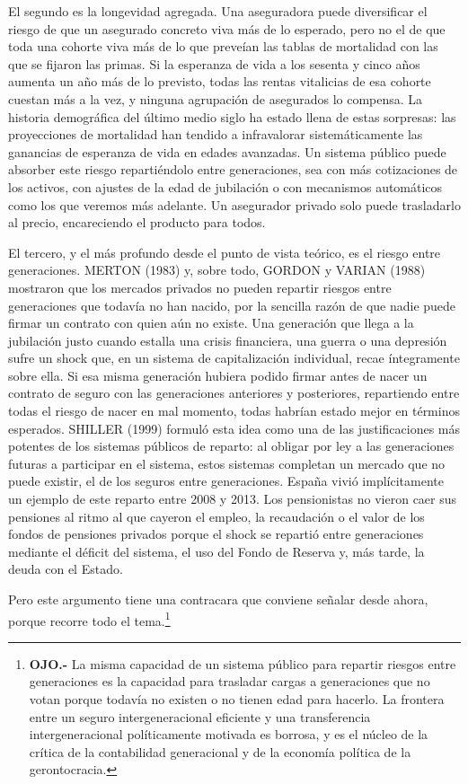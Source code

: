 \documentclass[10pt,a4paper]{article}
\begin{document}
El segundo es la longevidad agregada. Una aseguradora puede diversificar el riesgo de que un asegurado concreto viva más de lo esperado, pero no el de que toda una cohorte viva más de lo que preveían las tablas de mortalidad con las que se fijaron las primas. Si la esperanza de vida a los sesenta y cinco años aumenta un año más de lo previsto, todas las rentas vitalicias de esa cohorte cuestan más a la vez, y ninguna agrupación de asegurados lo compensa. La historia demográfica del último medio siglo ha estado llena de estas sorpresas: las proyecciones de mortalidad han tendido a infravalorar sistemáticamente las ganancias de esperanza de vida en edades avanzadas. Un sistema público puede absorber este riesgo repartiéndolo entre generaciones, sea con más cotizaciones de los activos, con ajustes de la edad de jubilación o con mecanismos automáticos como los que veremos más adelante. Un asegurador privado solo puede trasladarlo al precio, encareciendo el producto para todos.

El tercero, y el más profundo desde el punto de vista teórico, es el riesgo entre generaciones. MERTON (1983) y, sobre todo, GORDON y VARIAN (1988) mostraron que los mercados privados no pueden repartir riesgos entre generaciones que todavía no han nacido, por la sencilla razón de que nadie puede firmar un contrato con quien aún no existe. Una generación que llega a la jubilación justo cuando estalla una crisis financiera, una guerra o una depresión sufre un shock que, en un sistema de capitalización individual, recae íntegramente sobre ella. Si esa misma generación hubiera podido firmar antes de nacer un contrato de seguro con las generaciones anteriores y posteriores, repartiendo entre todas el riesgo de nacer en mal momento, todas habrían estado mejor en términos esperados. SHILLER (1999) formuló esta idea como una de las justificaciones más potentes de los sistemas públicos de reparto: al obligar por ley a las generaciones futuras a participar en el sistema, estos sistemas completan un mercado que no puede existir, el de los seguros entre generaciones. España vivió implícitamente un ejemplo de este reparto entre 2008 y 2013. Los pensionistas no vieron caer sus pensiones al ritmo al que cayeron el empleo, la recaudación o el valor de los fondos de pensiones privados porque el shock se repartió entre generaciones mediante el déficit del sistema, el uso del Fondo de Reserva y, más tarde, la deuda con el Estado.

Pero este argumento tiene una contracara que conviene señalar desde ahora, porque recorre todo el tema.\footnote{\textbf{OJO.-} La misma capacidad de un sistema público para repartir riesgos entre generaciones es la capacidad para trasladar cargas a generaciones que no votan porque todavía no existen o no tienen edad para hacerlo. La frontera entre un seguro intergeneracional eficiente y una transferencia intergeneracional políticamente motivada es borrosa, y es el núcleo de la crítica de la contabilidad generacional y de la economía política de la gerontocracia.
}
\end{document}

